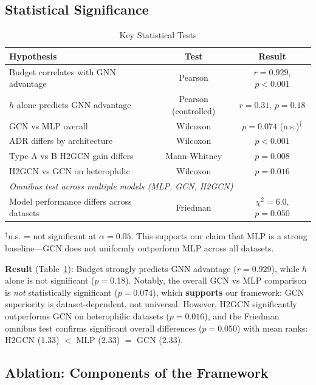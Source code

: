 \subsection{Statistical Significance}

\begin{table}[t]
\centering
\caption{Key Statistical Tests}
\label{tab:statistics}
\begin{tabular}{@{}lcc@{}}
\toprule
\textbf{Hypothesis} & \textbf{Test} & \textbf{Result} \\
\midrule
Budget correlates with GNN advantage & Pearson & $r = 0.929$, $p < 0.001$ \\
$h$ alone predicts GNN advantage & Pearson (controlled) & $r = 0.31$, $p = 0.18$ \\
GCN vs MLP overall & Wilcoxon & $p = 0.074$ (n.s.)$^\dagger$ \\
ADR differs by architecture & Wilcoxon & $p < 0.001$ \\
Type A vs B H2GCN gain differs & Mann-Whitney & $p = 0.008$ \\
H2GCN vs GCN on heterophilic & Wilcoxon & $p = 0.016$ \\
\midrule
\multicolumn{3}{l}{\textit{Omnibus test across multiple models (MLP, GCN, H2GCN)}} \\
Model performance differs across datasets & Friedman & $\chi^2 = 6.0$, $p = 0.050$ \\
\bottomrule
\end{tabular}
\vspace{1mm}
\raggedright\small $^\dagger$n.s. = not significant at $\alpha = 0.05$. This supports our claim that MLP is a strong baseline---GCN does not uniformly outperform MLP across all datasets.
\end{table}

\textbf{Result} (Table~\ref{tab:statistics}): Budget strongly predicts GNN advantage ($r = 0.929$), while $h$ alone is not significant ($p = 0.18$). Notably, the overall GCN vs MLP comparison is \textit{not} statistically significant ($p = 0.074$), which \textbf{supports} our framework: GCN superiority is dataset-dependent, not universal. However, H2GCN significantly outperforms GCN on heterophilic datasets ($p = 0.016$), and the Friedman omnibus test confirms significant overall differences ($p = 0.050$) with mean ranks: H2GCN (1.33) $<$ MLP (2.33) $=$ GCN (2.33).

\subsection{Ablation: Components of the Framework}


